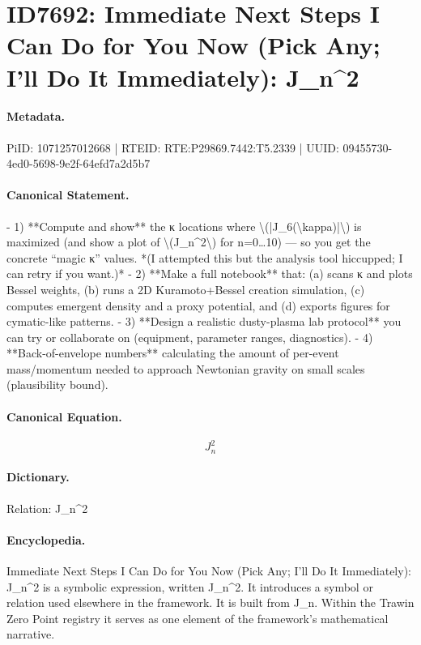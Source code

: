 \section*{ID7692: Immediate Next Steps I Can Do for You Now (Pick Any; I’ll Do It Immediately): J\_n\textasciicircum{}2}
\paragraph{Metadata.}
PiID: 1071257012668 | RTEID: RTE:P29869.7442:T5.2339 | UUID: 09455730-4ed0-5698-9e2f-64efd7a2d5b7

\paragraph{Canonical Statement.}
- 1) **Compute and show** the κ locations where \textbackslash{}(|J\_6(\textbackslash{}kappa)|\textbackslash{}) is maximized (and show a plot of \textbackslash{}(J\_n\textasciicircum{}2\textbackslash{}) for n=0…10) — so you get the concrete “magic κ” values. *(I attempted this but the analysis tool hiccupped; I can retry if you want.)* - 2) **Make a full notebook** that: (a) scans κ and plots Bessel weights, (b) runs a 2D Kuramoto+Bessel creation simulation, (c) computes emergent density and a proxy potential, and (d) exports figures for cymatic-like patterns. - 3) **Design a realistic dusty-plasma lab protocol** you can try or collaborate on (equipment, parameter ranges, diagnostics). - 4) **Back-of-envelope numbers** calculating the amount of per-event mass/momentum needed to approach Newtonian gravity on small scales (plausibility bound).

\paragraph{Canonical Equation.}
\[
J_n^2
\]

\paragraph{Dictionary.}
Relation: J\_n\textasciicircum{}2

\paragraph{Encyclopedia.}
Immediate Next Steps I Can Do for You Now (Pick Any; I’ll Do It Immediately): J\_n\textasciicircum{}2 is a symbolic expression, written J\_n\textasciicircum{}2. It introduces a symbol or relation used elsewhere in the framework. It is built from J\_n. Within the Trawin Zero Point registry it serves as one element of the framework's mathematical narrative.
